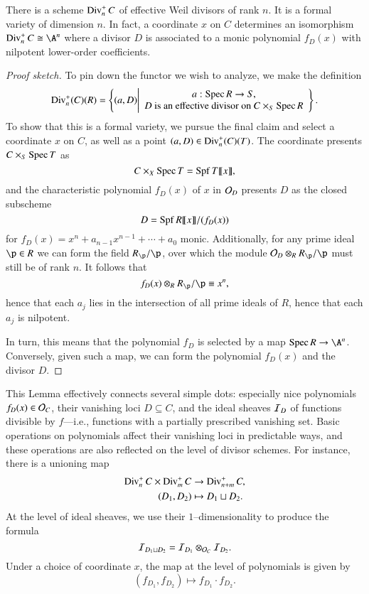 \begin{lemma}
There is a scheme $\operatorname{Div}_n^+ C$ of effective Weil divisors of rank $n$.  It is a formal variety of dimension $n$.  In fact, a coordinate $x$ on $C$ determines an isomorphism $\Div_n^+ C \cong \A^n$ where a divisor $D$ is associated to a monic polynomial $f_D(x)$ with nilpotent lower-order coefficients.
\end{lemma}
\begin{proof}[Proof sketch]
To pin down the functor we wish to analyze, we make the definition \[\operatorname{Div}_n^+(C)(R) = \left\{(a, D) \middle| \begin{array}{c} a: \operatorname{Spec} R \to S, \\ \text{$D$ is an effective divisor on $C \times_S \operatorname{Spec} R$} \end{array} \right\}.\]  To show that this is a formal variety, we pursue the final claim and select a coordinate $x$ on $C$, as well as a point $(a, D) \in \operatorname{Div}_n^+(C)(T)$.  The coordinate presents $C \times_S \operatorname{Spec} T$ as \[C \times_X \operatorname{Spec} T = \operatorname{Spf} T\llbracket x \rrbracket,\] and the characteristic polynomial $f_D(x)$ of $x$ in $\mathcal{O}_D$ presents $D$ as the closed subscheme \[D = \operatorname{Spf} R\llbracket x \rrbracket / (f_D(x))\] for $f_D(x) = x^n + a_{n-1} x^{n-1} + \cdots + a_0$ monic.  Additionally, for any prime ideal $\p \in R$ we can form the field $R_{\p} / \p$, over which the module $\sheaf O_D \otimes_R R_{\p} / \p$ must still be of rank $n$.  It follows that \[f_D(x) \otimes_R R_{\p} / \p \equiv x^n,\] hence that each $a_j$ lies in the intersection of all prime ideals of $R$, hence that each $a_j$ is nilpotent.

In turn, this means that the polynomial $f_D$ is selected by a map $\Spec R \to \A^n$.  Conversely, given such a map, we can form the polynomial $f_D(x)$ and the divisor $D$.
\end{proof}

\begin{remark}\label{DescriptionOfSqCupMapOnPolynomials}
This Lemma effectively connects several simple dots: especially nice polynomials $f_D(x) \in \mathcal{O}_C$, their vanishing loci $D \subseteq C$, and the ideal sheaves $\mathcal{I}_D$ of functions divisible by $f$---i.e., functions with a partially prescribed vanishing set.  Basic operations on polynomials affect their vanishing loci in predictable ways, and these operations are also reflected on the level of divisor schemes.  For instance, there is a unioning map
\begin{align*}
\operatorname{Div}_n^+ C \times \operatorname{Div}_m^+ C & \to \operatorname{Div}_{n+m}^+ C, \\
(D_1, D_2) & \mapsto D_1 \sqcup D_2.
\end{align*}
At the level of ideal sheaves, we use their $1$--dimensionality to produce the formula \[\mathcal{I}_{D_1 \sqcup D_2} = \mathcal{I}_{D_1} \otimes_{\mathcal{O}_C} \mathcal{I}_{D_2}.\]  Under a choice of coordinate $x$, the map at the level of polynomials is given by \[(f_{D_1}, f_{D_2}) \mapsto f_{D_1} \cdot f_{D_2}.\]
\end{remark}

